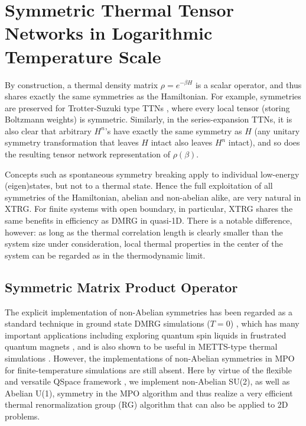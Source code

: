 \documentclass[aps,prx,twocolumn,showpacs,psfig,superscriptaddress,longbibliography]{revtex4-1}
\begin{document}
\section{Symmetric Thermal Tensor Networks in Logarithmic
Temperature Scale} \label{Sec:MPOD}

By construction, a thermal density matrix $\rho=e^{-\beta H}$
is a scalar operator, and thus shares exactly the same symmetries as
the Hamiltonian. For example, symmetries are preserved for
Trotter-Suzuki type TTNs \cite{Li.w+:2011:LTRG,
Ran.s+:2012:Super-orthogonalization}, where every local tensor
(storing Boltzmann weights) is symmetric.  Similarly, in the
series-expansion TTNs, it is also clear that arbitrary $H^n$'s have
exactly the same symmetry as $H$ (any unitary symmetry
transformation that leaves $H$ intact also leaves $H^n$ intact), and
so does the resulting tensor network representation of
$\rho(\beta)$. 

Concepts such as spontaneous symmetry breaking apply to individual
low-energy (eigen)states, but not to a thermal state.  Hence the
full exploitation of all symmetries of the Hamiltonian, abelian and
non-abelian alike, are very natural in XTRG. For finite systems with
open boundary, in particular, XTRG shares the same benefits in
efficiency as DMRG in quasi-1D. There is a notable difference,
however: as long as the thermal correlation length is clearly
smaller than the system size under consideration, local thermal
properties in the center of the system can be regarded as in the
thermodynamic limit.


\subsection{Symmetric Matrix Product Operator}

The explicit implementation of non-Abelian symmetries has been
regarded as a standard technique in ground state DMRG simulations
($T=0$) \cite{McCulloch.i.p+:2002:NonAbelian}, which has many
important applications including exploring quantum spin liquids in
frustrated quantum magnets \cite{Depenbrock.s+:2012:SpinLiquid,
Gong.s+:2014:Plaquette}, and is also shown to be useful in
METTS-type thermal simulations \cite{Bruognolo.b+:2015:SYMETTS,
Binder.m+:2017:SYMETTS}. However, the implementations of non-Abelian
symmetries in MPO for finite-temperature simulations are still
absent. Here by virtue of the flexible and versatile QSpace
framework \cite{Weichselbaum.a:2012:QSpace}, we implement
non-Abelian SU(2), as well as Abelian U(1), symmetry in the MPO
algorithm and thus realize a very efficient thermal renormalization
group (RG) algorithm that can also be applied to 2D problems.
\end{document}
